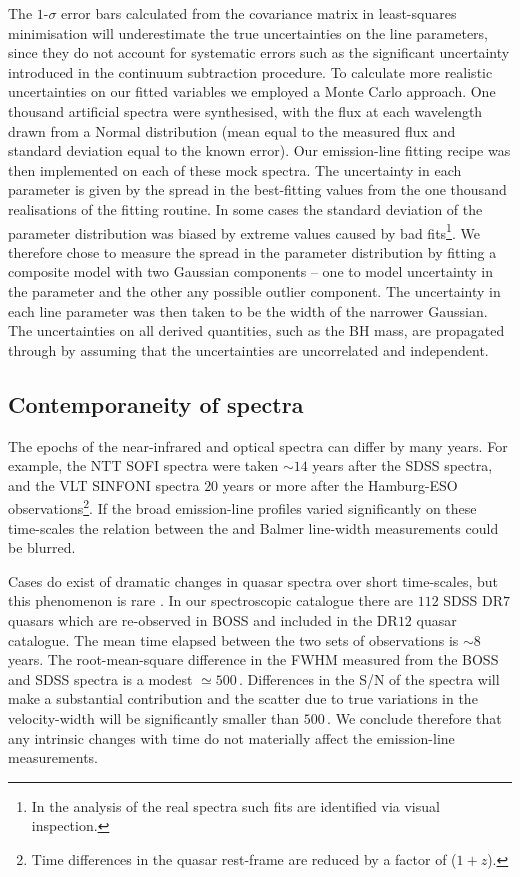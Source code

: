 The $1$-$\sigma$ error bars calculated from the covariance matrix in least-squares minimisation will underestimate the true uncertainties on the line parameters, since they do not account for systematic errors such as the significant uncertainty introduced in the continuum subtraction procedure.  
To calculate more realistic uncertainties on our fitted variables we employed a Monte Carlo approach. 
One thousand artificial spectra were synthesised, with the flux at each wavelength drawn from a Normal distribution (mean equal to the measured flux and standard deviation equal to the known error).
Our emission-line fitting recipe was then implemented on each of these mock spectra. 
The uncertainty in each parameter is given by the spread in the best-fitting values from the one thousand realisations of the fitting routine. 
In some cases the standard deviation of the parameter distribution was biased by extreme values caused by bad fits\footnote{In the analysis of the real spectra such fits are identified via visual inspection.}. 
We therefore chose to measure the spread in the parameter distribution by fitting a composite model with two Gaussian components -- one to model uncertainty in the parameter and the other any possible outlier component. 
The uncertainty in each line parameter was then taken to be the width of the narrower Gaussian. 
The uncertainties on all derived quantities, such as the BH mass, are propagated through by assuming that the uncertainties are uncorrelated and independent. 

\subsection{Contemporaneity of spectra}

The epochs of the near-infrared and optical spectra can differ by many years.
For example, the NTT SOFI spectra were taken $\sim14$ years after the SDSS spectra, and the VLT SINFONI spectra $20$ years or more after the Hamburg-ESO observations\footnote{Time differences in the quasar rest-frame are reduced by a factor of ($1 + z$).}.
If the broad emission-line profiles varied significantly on these time-scales the relation between the  and Balmer line-width measurements could be blurred. 

Cases do exist of dramatic changes in quasar spectra over short time-scales, but this phenomenon is rare \citep{macleod16}. 
In our spectroscopic catalogue there are $112$ SDSS DR$7$ quasars which are re-observed in BOSS and included in the DR$12$ quasar catalogue. 
The mean time elapsed between the two sets of observations is $\sim8$ years. 
The root-mean-square difference in the  FWHM measured from the BOSS and SDSS spectra is a modest $\simeq500$\,\kms. 
Differences in the S/N of the spectra will make a substantial contribution and the scatter due to true variations in the  velocity-width will be significantly smaller than $500$\,\kms. 
We conclude therefore that any intrinsic changes with time do not materially affect the emission-line measurements.

